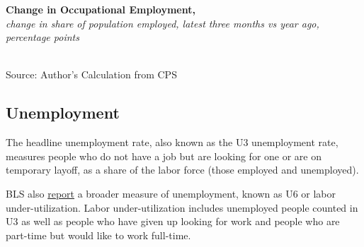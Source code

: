 \documentclass{report}
\newcommand{\tbllink}[1]{\href{https://raw.githubusercontent.com/bdecon/US-chartbook/master/chartbook/data/#1}{\faTable}}
\newcommand{\barylab}[2]{yticklabel style={text width=#1, align=right, 
		style={black!70}, text height=#2},}
\newcommand{\bbar}[2]{extra #1 ticks = {{#2}}, extra #1 tick labels = ,
		extra #1 tick style = {grid=major, grid style={thick, black!25}},}
\begin{document}
{{\begin{minipage}{0.76\textwidth}
\normalsize \textbf{Change in Occupational Employment, }\\
\footnotesize{\textit{change in share of population employed, latest three months vs year ago, percentage points}}\\
\hspace*{-9mm}  \\
\footnotesize{Source: Author's Calculation from CPS} \hfill \tbllink{occs.csv}
\end{minipage}
\newpage
\begin{minipage}{0.76\textwidth} 
\subsection*{\color{black!70} \seriffont Unemployment}
\small The headline unemployment rate, also known as the U3 unemployment rate, measures people who do not have a job but are looking for one or are on temporary layoff, as a share of the labor force (those employed and unemployed). 
\end{minipage}

\begin{minipage}{0.305\textwidth}
\small BLS also \href{https://www.bls.gov/news.release/empsit.t15.htm}{report} a broader measure of unemployment, known as U6 or labor under-utilization. Labor under-utilization includes unemployed people counted in U3 as well as people who have given up looking for work and people who are part-time but would like to work full-time. 


\end{minipage}}}
\end{document}
